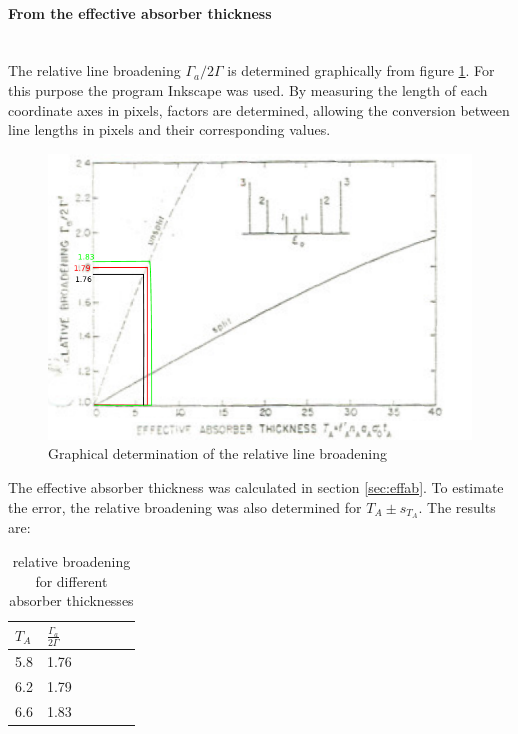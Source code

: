 \paragraph{From the effective absorber thickness} \ \\
The relative line broadening $\Gamma_a/2\Gamma$ is determined graphically from figure \ref{fig:absorberthicknessevaluated}. For this purpose the program Inkscape was used. By measuring the length of each coordinate axes in pixels, factors are determined, allowing the conversion between line lengths in pixels and their corresponding values.\\
\begin{figure}[hbp]
	\centering
	\includegraphics[width=1.0\linewidth]{graphics/absorberthicknessevaluated}
	\caption{Graphical determination of the relative line broadening\cite{Frauenfelder}}
	\label{fig:absorberthicknessevaluated}
\end{figure}
The effective absorber thickness was calculated in section \ref{sec:effab}. To estimate the error, the relative broadening was also determined for $T_A\pm s_{T_A}$. The results are:
\begin{table}[H]\centering
	\begin{tabular}{@{}llllll@{}}
		\toprule
		$T_A$ & $\frac{\Gamma_a}{2\Gamma}$ \\
		\midrule
		5.8 & 1.76\\
		6.2 & 1.79 \\
		6.6 & 1.83 \\
	\end{tabular}
	\caption[relative broadening]{relative broadening for different absorber thicknesses}
	\label{tb:relative broadening}
\end{table}

